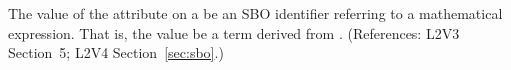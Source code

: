 The value of the  attribute on a \Delay {} be an SBO
identifier referring to a mathematical expression.  That is, the value
 be a term derived from \sbomathformula.  (References: 
L2V3 Section~5; L2V4 Section~\ref{sec:sbo}.)
